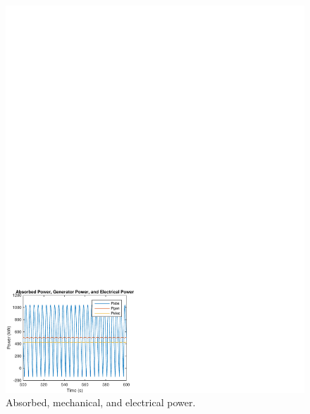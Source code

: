 \documentclass[twocolumn,10pt]{asme2e}
\begin{document}
\begin{figure}[t]
    \centering
    \includegraphics[width=1\columnwidth]{Images/HYDPower}
    \caption{Absorbed, mechanical, and electrical power. }
    \label{HydP}
    \end{figure}

\end{document}
